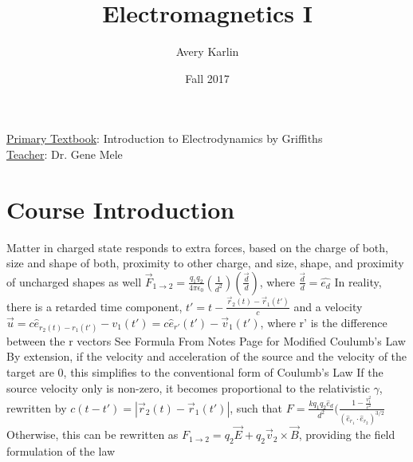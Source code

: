 \documentclass[11 pt, twoside]{article}
\newenvironment{outline*}
{
	\begin{outline}[enumerate]
	}
	{\end{outline}
}
\begin{document}
\title{Electromagnetics I}
\author{Avery Karlin}
\date{Fall 2017}
\newcommand{\textbook}{Introduction to Electrodynamics by Griffiths}
\newcommand{\teacher}{Dr. Gene Mele}

\maketitle
\newpage
\hypertarget{content}{\tableofcontents}
\vspace{11pt}
\noindent
\underline{Primary Textbook}: \textbook\\
\underline{Teacher}: \teacher
\newpage

\section{Course Introduction}
\begin{outline*}
\1 Matter in charged state responds to extra forces, based on the charge of both, size and shape of both, proximity to other charge, and size, shape, and proximity of uncharged shapes as well
	\2 $\vec{F}_{1\to2} = \frac{q_1q_2}{4\pi\epsilon_0}(\frac{1}{d^2})(\frac{\vec{d}}{d})$, where $\frac{\vec{d}}{d} = \hat{e_d}$
	\2 In reality, there is a retarded time component, $t' = t - \frac{\vec{r}_2(t) - \vec{r}_1(t')}{c}$ and a velocity $\vec{u} = c\hat{e}_{r_2(t) - r_1(t')} - v_1(t') = c\hat{e}_{r'}(t') - \vec{v}_1(t')$, where r' is the difference between the r vectors
		\3 See Formula From Notes Page for Modified Coulumb's Law
		\3 By extension, if the velocity and acceleration of the source and the velocity of the target are 0, this simplifies to the conventional form of Coulumb's Law
		\3 If the source velocity only is non-zero, it becomes proportional to the relativistic $\gamma$, rewritten by $c(t - t') = |\vec{r}_2(t) - \vec{r}_1(t')|$, such that $F = \frac{kq_1q_2\hat{e}_{d}}{d^2}(\frac{1 - \frac{v_1^2}{c^2}}{(\hat{e}_{r_1} \cdot \hat{e}_{r_2})^{3/2}}$
		\3 Otherwise, this can be rewritten as $F_{1\to2} = q_2\vec{E} + q_2\vec{v}_2 \times \vec{B}$, providing the field formulation of the law
\end{outline*}
\end{document}
